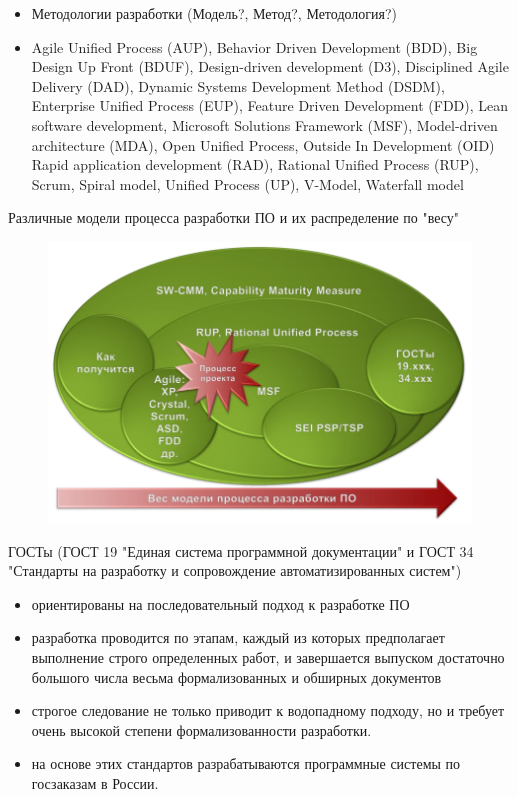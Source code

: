 \documentclass{beamer}
\begin{document}
\begin{frame}[t]
\begin{itemize}
\item Методологии разработки (Модель?, Метод?, Методология?)
\item Agile Unified Process (AUP), Behavior Driven
Development (BDD), Big Design Up Front (BDUF),
Design-driven development (D3), Disciplined Agile
Delivery (DAD), Dynamic Systems Development
Method (DSDM), Enterprise Unified Process (EUP),
Feature Driven Development (FDD), Lean software
development, Microsoft Solutions Framework (MSF),
Model-driven architecture (MDA), Open Unified
Process, Outside In Development (OID) Rapid
application development (RAD), Rational Unified
Process (RUP), Scrum, Spiral model, Unified Process
(UP), V-Model, Waterfall model
\end{itemize}
\end{frame}

\begin{frame}
Различные модели процесса разработки ПО и их распределение по "весу"
\begin{figure}[h]
\centering
\includegraphics[scale=0.5]{images/lec01-pic03.png}
\label{pic-sort}
\end{figure}
\end{frame}

\begin{frame}[t]
ГОСТы (ГОСТ 19 "Единая система программной документации" и ГОСТ 34 "Стандарты
на разработку и сопровождение автоматизированных систем")
\begin{itemize}
\item ориентированы на последовательный подход к разработке ПО
\item разработка проводится по этапам, каждый из которых предполагает выполнение строго определенных работ, и завершается выпуском достаточно большого числа весьма формализованных и обширных документов
\item строгое следование не только приводит к водопадному подходу, но и требует очень высокой степени формализованности разработки.
\item на основе этих стандартов разрабатываются программные системы по госзаказам в России.
\end{itemize}
\end{frame}
\end{document}

